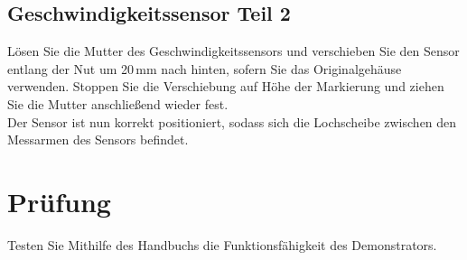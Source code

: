 \section{Geschwindigkeitssensor Teil 2}
Lösen Sie die Mutter des Geschwindigkeitssensors und verschieben Sie den Sensor entlang der Nut um 20 mm nach hinten, sofern Sie das Originalgehäuse verwenden. Stoppen Sie die Verschiebung auf Höhe der Markierung und ziehen Sie die Mutter anschließend wieder fest.\\

Der Sensor ist nun korrekt positioniert, sodass sich die Lochscheibe zwischen den Messarmen des Sensors befindet.




\chapter{Prüfung}

	\item Testen Sie Mithilfe des Handbuchs die Funktionsfähigkeit des Demonstrators. 

